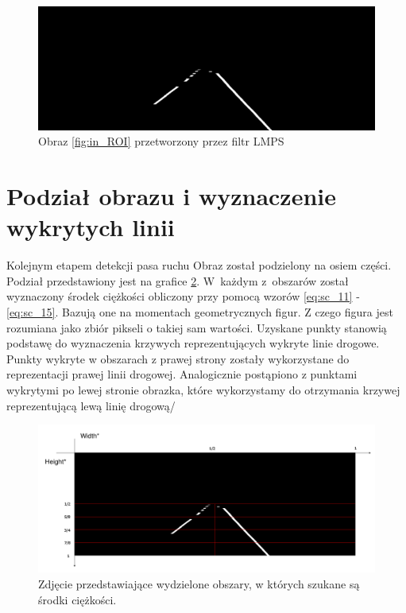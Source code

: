 \begin{figure}[h]
	\centering
	\includegraphics[scale=0.3]{obraz_lmps.png}
	\caption{Obraz \ref{fig:in_ROI} przetworzony przez filtr LMPS}
	\label{fig:img_1_lmps}
\end{figure}


\section{Podział obrazu i wyznaczenie wykrytych linii}

Kolejnym etapem detekcji pasa ruchu 
Obraz został podzielony na osiem części. Podział przedstawiony jest na grafice \ref{fig:ograniczenia}.
W~każdym z~obszarów został wyznaczony środek ciężkości obliczony przy pomocą wzorów \eqref{eq:sc_11} - \eqref{eq:sc_15}. Bazują one na momentach geometrycznych figur. Z czego figura jest rozumiana jako zbiór pikseli o takiej sam wartości.
Uzyskane punkty stanowią podstawę do wyznaczenia krzywych reprezentujących wykryte linie drogowe. Punkty wykryte w obszarach z prawej strony zostały wykorzystane do reprezentacji prawej linii drogowej. Analogicznie postąpiono z punktami wykrytymi po lewej stronie obrazka, które wykorzystamy do otrzymania krzywej reprezentującą lewą linię drogową/

\begin{figure}
	\centering
	\includegraphics[scale=0.3]{ograniczenia.png}
	\caption{Zdjęcie przedstawiające wydzielone obszary, w których szukane są środki ciężkości.} 
	\label{fig:ograniczenia}
\end{figure}

